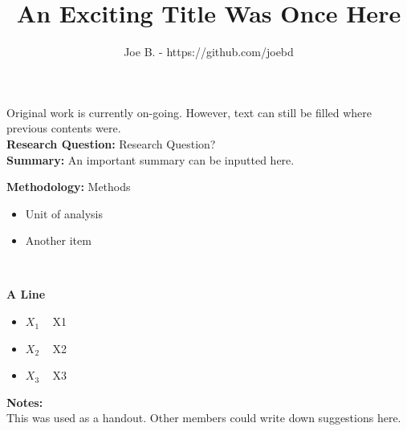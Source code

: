 \documentclass[12pt]{article}
\title{An Exciting Title Was Once Here}
\author{Joe B. - https://github.com/joebd}
\begin{document}
\maketitle

Original work is currently on-going. However, text can still be filled where previous contents were. \\


\textbf{Research Question:}  Research Question? \\  


\textbf{Summary:} 
An important summary can be inputted here.  

\vspace{1cm}


\textbf{Methodology:} Methods  
\begin{itemize}
	\item{Unit of analysis}
	\item{Another item}  
\end{itemize}
\vspace{0.75cm} \

\textbf{A Line} 
\vspace{0.5cm} 




\begin{itemize}
	
	\item[] { $X_{1}$} ~ X1
	\item[] { $X_{2}$} ~ X2
	\item[] { $X_{3}$}  ~  X3
	
\end{itemize}
\vspace{0.5cm} 
\textbf{Notes:} \\ 
This was used as a handout. Other members could write down suggestions here. 
\end{document}
